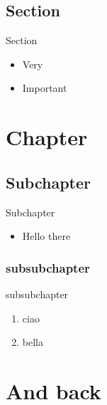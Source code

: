 \section{Section}


\begin{frame}[fragile]{Section}

\begin{itemize}
\item\relax 
Very



\item\relax 
Important




\end{itemize}
\end{frame}

\chapter{Chapter}

\section{Subchapter}


\begin{frame}[fragile]{Subchapter}

\begin{itemize}
\item\relax 
Hello there




\end{itemize}
\end{frame}

\subsection{subsubchapter}


\begin{frame}[fragile]{subsubchapter}

\begin{enumerate}[1.]
\item\relax 
ciao



\item\relax 
bella




\end{enumerate}
\end{frame}

\chapter{And back}

